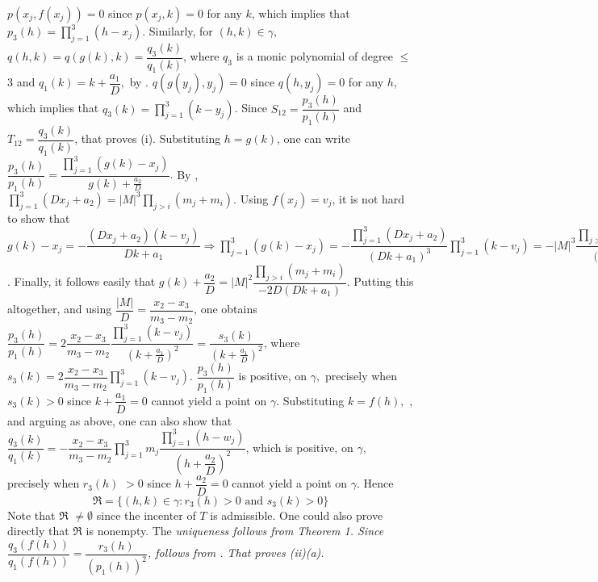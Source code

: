 $p(x_{j},f(x_{j}))=0$ since $p(x_{j},k)=0$ for any $k$, which implies that $p_{3}(h)=\prod\limits_{j=1}^{3}(h-x_{j}).$ Similarly, for $(h,k)\in \gamma ,$ $q(h,k)=q(g(k),k)=\dfrac{q_{3}(k)}{q_{1}(k)}$, where $q_{3}$ is a monic polynomial of degree $\leq$ $3$ and $q_{1}(k)=k+\dfrac{a_{1}}{D},$ by . $q(g(y_{j}),y_{j})=0$ since $q(h,y_{j})=0$ for any $h$, which implies that $q_{3}(k)=\prod\limits_{j=1}^{3}(k-y_{j})$. Since $S_{12}=\dfrac{p_{3}(h)}{p_{1}(h)}$ and $T_{12}=\dfrac{q_{3}(k)}{q_{1}(k)}$, that proves (i). Substituting $h=g(k)$, one can write $\dfrac{p_{3}(h)}{p_{1}(h)}=\dfrac{\prod\limits_{j=1}^{3}(g(k)-x_{j})}{g(k)+\frac{a_{2}}{D}}.$ By , $\prod\limits_{j=1}^{3}(Dx_{j}+a_{2})= \vert M \vert ^3 \prod\limits_{j>i}(m_{j}+m_{i})$. Using $f(x_{j})=v_{j}$, it is not hard to show that $g(k)-x_{j}=-\dfrac{(Dx_{j}+a_{2})(k-v_{j})}{Dk+a_{1}}\Rightarrow \prod\limits_{j=1}^{3}(g(k)-x_{j})=-\dfrac{\prod\limits_{j=1}^{3}(Dx_{j}+a_{2})}{(Dk+a_{1})^{3}}\prod\limits_{j=1}^{3}(k-v_{j})=-\vert M \vert ^3 \dfrac{\prod\limits_{j>i}(m_{j}+m_{i})}{(Dk+a_{1})^{3}}\prod\limits_{j=1}^{3}(k-v_{j})$. Finally, it follows easily that $g(k)+\dfrac{a_{2}}{D}=\vert M \vert ^2 \dfrac{\prod\limits_{j>i}(m_{j}+m_{i})}{-2D(Dk+a_{1})}$. Putting this altogether, and using $\dfrac{\vert M \vert}{D}=\dfrac{x_{2}-x_{3}}{m_{3}-m_{2}}$, one obtains $\dfrac{p_{3}(h)}{p_{1}(h)}=2\dfrac{x_{2}-x_{3}}{m_{3}-m_{2}}\dfrac{\prod\limits_{j=1}^{3}(k-v_{j})}{(k+\frac{a_{1}}{D})^{2}}=\dfrac{s_{3}(k)}{(k+\frac{a_{1}}{D})^{2}}$, where $s_{3}(k)=2\dfrac{x_{2}-x_{3}}{m_{3}-m_{2}}\prod\limits_{j=1}^{3}(k-v_{j})$. $\dfrac{p_{3}(h)}{p_{1}(h)}$ is positive, on $\gamma,$ precisely when $s_{3}(k)>0$ since $k+\dfrac{a_{1}}{D}=0$ cannot yield a point on $\gamma.$ Substituting $k=f(h),$ , and arguing as above, one can also show that $\dfrac{q_{3}(k)}{q_{1}(k)}=-\dfrac{x_{2}-x_{3}}{m_{3}-m_{2}}\prod\limits_{j=1}^{3}m_{j}\dfrac{\prod\limits_{j=1}^{3}(h-w_{j})}{(h+\dfrac{a_{2}}{D})^{2}}$, which is positive, on $\gamma ,$ precisely when $r_{3}(h)$ $>0$ since $h+\dfrac{a_{2}}{D}=0$ cannot yield a point on $\gamma.$ Hence $$\Re =\{(h,k)\in \gamma: r_{3}(h)>0\text{ and }s_{3}(k)>0\}\tag{52}$$ Note that $\Re $ $\neq \emptyset $ since the incenter of $T$ is admissible. One could also prove directly that $\Re $ is nonempty. The \it uniqueness \rm follows from Theorem 1. Since $\dfrac{q_{3}(f(h))}{q_{1}(f(h))}=\dfrac{r_{3}(h)}{(p_{1}(h))^{2}}$,  follows from . That proves (ii)(a). \nl 	
